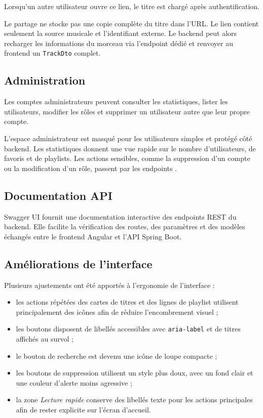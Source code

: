 \documentclass[12pt,a4paper]{report}
\newcommand{\code}[1]{\texttt{#1}}
\begin{document}
Lorsqu'un autre utilisateur ouvre ce lien, le titre est chargé après
authentification.

Le partage ne stocke pas une copie complète du titre dans l'URL. Le lien
contient seulement la source musicale et l'identifiant externe. Le backend peut
alors recharger les informations du morceau via l'endpoint dédié et renvoyer au
frontend un \code{TrackDto} complet.

\subsection{Administration}

Les comptes administrateurs peuvent consulter les statistiques, lister les
utilisateurs, modifier les rôles et supprimer un utilisateur autre que leur
propre compte.

L'espace administrateur est masqué pour les utilisateurs simples et protégé
côté backend. Les statistiques donnent une vue rapide sur le nombre
d'utilisateurs, de favoris et de playlists. Les actions sensibles, comme la
suppression d'un compte ou la modification d'un rôle, passent par les endpoints
.

\subsection{Documentation API}

Swagger UI fournit une documentation interactive des endpoints REST du backend.
Elle facilite la vérification des routes, des paramètres et des modèles échangés
entre le frontend Angular et l'API Spring Boot.

\subsection{Améliorations de l'interface}

Plusieurs ajustements ont été apportés à l'ergonomie de l'interface :

\begin{itemize}
    \item les actions répétées des cartes de titres et des lignes de playlist
    utilisent principalement des icônes afin de réduire l'encombrement visuel ;
    \item les boutons disposent de libellés accessibles avec \code{aria-label}
    et de titres affichés au survol ;
    \item le bouton de recherche est devenu une icône de loupe compacte ;
    \item les boutons de suppression utilisent un style plus doux, avec un fond
    clair et une couleur d'alerte moins agressive ;
    \item la zone \textit{Lecture rapide} conserve des libellés texte pour les
    actions principales afin de rester explicite sur l'écran d'accueil.
\end{itemize}
\end{document}
